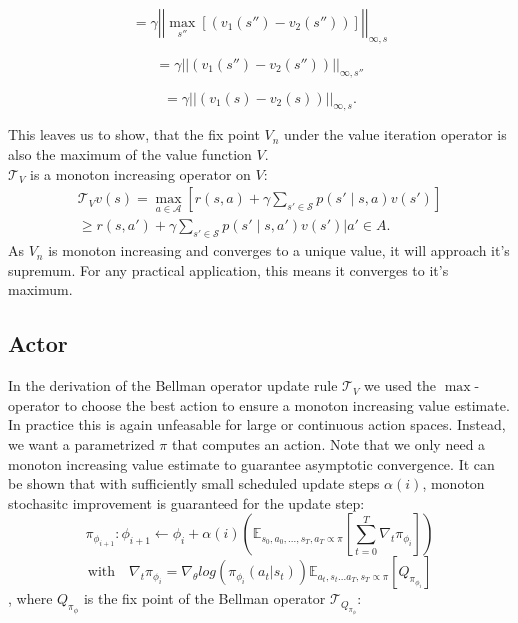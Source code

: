 \begin{equation}
= \gamma \left|\left|\max_{s''} \left[ (v_1(s'') - v_2(s''))\right]\right|\right|_{\infty, s}
\end{equation}

\begin{equation}
= \gamma \left|\left|(v_1(s'') - v_2(s''))\right|\right|_{\infty, s''}
\end{equation}

\begin{equation}
= \gamma \left|\left|(v_1(s) - v_2(s))\right|\right|_{\infty, s}.
\end{equation}

This leaves us to show, that the fix point $V_n$ under the value iteration operator is also the maximum of the value function $V$.\\
$\mathcal{T}_{V}$ is a monoton increasing operator on $V$: 
\begin{equation}
    \begin{align}
        \mathcal{T}_{V}v(s) = \max_{a \in \mathcal{A}} \left[ r(s,a) + \gamma  \sum_{s' \in \mathcal{S}} p(s' \mid s,a) v(s')\right]\\
        \geq r(s,a') + \gamma  \sum_{s' \in \mathcal{S}} p(s' \mid s,a') v(s') |a' \in A.
    \end{align}
\end{equation}
As $V_n$ is monoton increasing and converges to a unique value, it will approach it's supremum. 
For any practical application, this means it converges to it's maximum.

\subsection{Actor}
In the derivation of the Bellman operator update rule $\mathcal{T}_{V}$ we used the $\max$-operator to choose the best action to ensure a monoton increasing 
value estimate. In practice this is again unfeasable for large or continuous action spaces. Instead, we want a parametrized $\pi$ that computes an action. 
Note that we only need a monoton increasing value estimate to guarantee asymptotic convergence. It can be shown that with sufficiently small scheduled update 
steps $\alpha(i)$, monoton stochasitc improvement is guaranteed for the update step:
\begin{equation}
    \pi_{\phi_{i+1}}: \phi_{i+1} \leftarrow \phi_i + \alpha(i) \left(
        \mathbb{E}_{s_0, a_0, ... ,s_T, a_T \propto \pi} \left[
            \sum_{t=0}^{T} \nabla_t \pi_{\phi_i} \right]
    \right)
\end{equation}
\begin{equation*}
    \text{with} \quad \nabla_t \pi_{\phi_i} = \nabla_{\theta} log \left( \pi_{\phi_i}(a_t|s_t)\right) \mathbb{E}_{a_t, s_t...a_T, s_T \propto \pi} \left[ Q_{\pi_{\phi_i}} \right] 
\end{equation*}
, where $Q_{\pi_{\phi}}$ is the fix point of the Bellman operator $\mathcal{T}_{Q_{\pi_{\phi}}}$:

